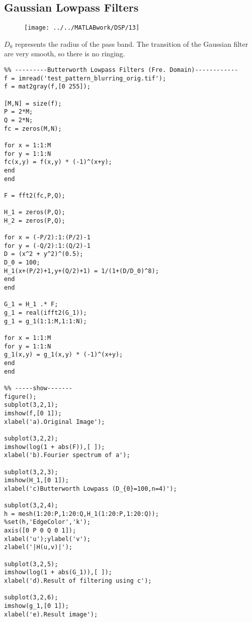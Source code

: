 \documentclass[12pt,a4paper]{article}
\begin{document}
\subsection{Gaussian Lowpass Filters}
\begin{figure}[ht]
	\begin{center}
		\texttt{[image: ../../MATLABwork/DSP/13]}
	\end{center}
\end{figure}
$D_0$ represents the radius of the pass band. The transition of the Gaussian filter are very smooth, so there is no ringing.
\lstset{language=Matlab}
\begin{lstlisting}
%% ---------Butterworth Lowpass Filters (Fre. Domain)------------
f = imread('test_pattern_blurring_orig.tif');
f = mat2gray(f,[0 255]);

[M,N] = size(f);
P = 2*M;
Q = 2*N;
fc = zeros(M,N);

for x = 1:1:M
for y = 1:1:N
fc(x,y) = f(x,y) * (-1)^(x+y);
end
end

F = fft2(fc,P,Q);

H_1 = zeros(P,Q);
H_2 = zeros(P,Q);

for x = (-P/2):1:(P/2)-1
for y = (-Q/2):1:(Q/2)-1
D = (x^2 + y^2)^(0.5);
D_0 = 100;
H_1(x+(P/2)+1,y+(Q/2)+1) = 1/(1+(D/D_0)^8);   
end
end

G_1 = H_1 .* F;
g_1 = real(ifft2(G_1));
g_1 = g_1(1:1:M,1:1:N);

for x = 1:1:M
for y = 1:1:N
g_1(x,y) = g_1(x,y) * (-1)^(x+y);
end
end

%% -----show-------
figure();
subplot(3,2,1);
imshow(f,[0 1]);
xlabel('a).Original Image');

subplot(3,2,2);
imshow(log(1 + abs(F)),[ ]);
xlabel('b).Fourier spectrum of a');

subplot(3,2,3);
imshow(H_1,[0 1]);
xlabel('c)Butterworth Lowpass (D_{0}=100,n=4)');

subplot(3,2,4);
h = mesh(1:20:P,1:20:Q,H_1(1:20:P,1:20:Q));
%set(h,'EdgeColor','k');
axis([0 P 0 Q 0 1]);
xlabel('u');ylabel('v');
zlabel('|H(u,v)|');

subplot(3,2,5);
imshow(log(1 + abs(G_1)),[ ]);
xlabel('d).Result of filtering using c');

subplot(3,2,6);
imshow(g_1,[0 1]);
xlabel('e).Result image');
\end{lstlisting}



\end{document}
